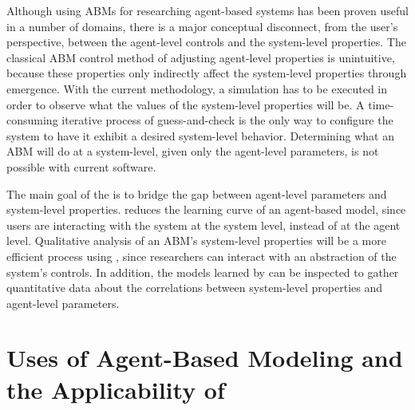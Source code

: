 Although using ABMs for researching agent-based systems has been proven useful in a number of domains, there is a major conceptual disconnect, from the user's perspective, between the agent-level controls and the system-level properties.
The classical ABM control method of adjusting agent-level properties is unintuitive, because these properties only indirectly affect the system-level properties through emergence.
With the current methodology, a simulation has to be executed in order to observe what the values of the system-level properties will be.
A time-consuming iterative process of guess-and-check is the only way to configure the system to have it exhibit a desired system-level behavior.
Determining what an ABM will do at a system-level, given only the agent-level parameters, is not possible with current software.

The main goal of the \framework is to bridge the gap between agent-level parameters and system-level properties.
\fw reduces the learning curve of an agent-based model, since users are interacting with the system at the system level, instead of at the agent level.
Qualitative analysis of an ABM's system-level properties will be a more efficient process using \fw, since researchers can interact with an abstraction of the system's controls.
In addition, the models learned by \fw can be inspected to gather quantitative data about the correlations between system-level properties and agent-level parameters.

\section{Uses of Agent-Based Modeling and the Applicability of \fw}

